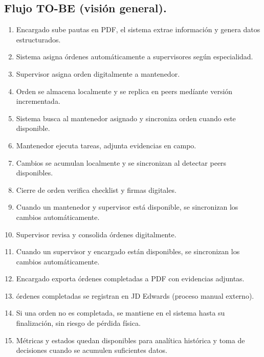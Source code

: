 \documentclass[10pt,a4paper]{report}
\begin{document}
\subsection*{Flujo TO-BE (visión general).}
\begin{enumerate}
    \item Encargado sube pautas en PDF, el sistema extrae información y genera datos estructurados.
    \item Sistema asigna órdenes automáticamente a supervisores según especialidad.
    \item Supervisor asigna orden digitalmente a mantenedor.
    \item Orden se almacena localmente y se replica en peers medíante versión incrementada.
    \item Sistema busca al mantenedor asignado y sincroniza orden cuando este disponible.
    \item Mantenedor ejecuta tareas, adjunta evidencias en campo.
    \item Cambios se acumulan localmente y se sincronizan al detectar peers disponibles.
    \item Cierre de orden verifica checklist y firmas digitales.
    \item Cuando un mantenedor y supervisor está disponible, se sincronizan los cambios automáticamente.
    \item Supervisor revisa y consolida órdenes digitalmente.
    \item Cuando un supervisor y encargado están disponibles, se sincronizan los cambios automáticamente.
    \item Encargado exporta órdenes completadas a PDF con evidencias adjuntas.
    \item órdenes completadas se registran en JD Edwards (proceso manual externo).
    \item Si una orden no es completada, se mantiene en el sistema hasta su finalización, sin riesgo de pérdida física.
    \item Métricas y estados quedan disponibles para analítica histórica y toma de decisiones cuando se acumulen suficientes datos.
\end{enumerate}
\end{document}

